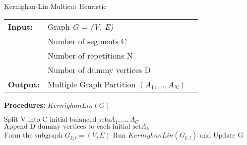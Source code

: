 \begin{algorithm}[H]
\caption{Kernighan-Lin Multicut Heuristic}
\begin{table}[H]
  \begin{tabular}{@{}lll@{}}
    \textbf{Input:} & Graph \emph{G = (V, E)} \\
        & Number of segments C \\
    & Number of repetitions N  \\
    & Number of dummy vertices D \\
	\textbf{Output:} & Multiple Graph Partition $\left( A_1,\dots, A_N \right)$ 
  \end{tabular} 
\end{table}
\textbf{Procedures:} $KernighanLin(G)$  \\
\setlength{\fboxrule}{0pt} 
\begin{boxedminipage}{1.0\textwidth}
  \begin{algorithmic}[1]
  	  \State $\text{Split V into C initial balanced sets} A_1,\dots,A_C$
  	  \State $\text{Append D dummy vertices to each initial set} A_k$ 
        \State $ \text{Form the subgraph } G_{k,l} = (V, E)$
		\State $\text{Run } KernighanLin(G_{k,l}) \text{ and Update G}$
      \EndFor
  \end{algorithmic}
  \end{boxedminipage}
  \vskip1.5pt
\label{alg:kl_multiple_segments}
\end{algorithm}  
  
